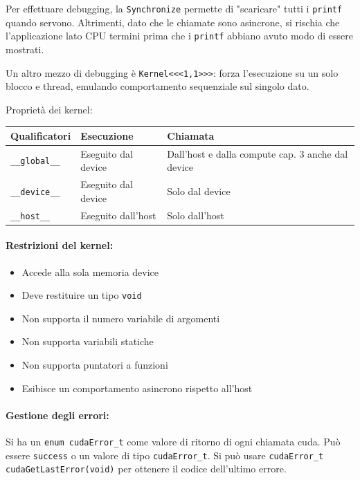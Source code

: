 Per effettuare debugging, la \texttt{Synchronize} permette di "scaricare" tutti i \texttt{printf} quando servono. Altrimenti, dato che le chiamate sono asincrone, si rischia che l'applicazione lato CPU termini prima che i \texttt{printf} abbiano avuto modo di essere mostrati.

Un altro mezzo di debugging è \texttt{Kernel<<<1,1>>>}: forza l'esecuzione su un solo blocco e thread, emulando comportamento sequenziale sul singolo dato.

Proprietà dei kernel: 
\begin{center}
	\begin{tabular}{| l | l | p{4cm} |}
		\hline
		\textbf{Qualificatori} & \textbf{Esecuzione} & \textbf{Chiamata} \\
		\hline
		\texttt{\_\_global\_\_} & Eseguito dal device & Dall’host e dalla compute cap. 3 anche dal device \\
		\hline
		\texttt{\_\_device\_\_} & Eseguito dal device & Solo dal device \\
		\hline
		\texttt{\_\_host\_\_} & Eseguito dall’host & Solo dall’host \\
		\hline
	\end{tabular}
\end{center}

\paragraph{Restrizioni del kernel:}
\begin{itemize}
	\item Accede alla sola memoria device
	
	\item Deve restituire un tipo \texttt{void}
	
	\item Non supporta il numero variabile di argomenti
	
	\item Non supporta variabili statiche
	
	\item Non supporta puntatori a funzioni
	
	\item Esibisce un comportamento asincrono rispetto all'host
\end{itemize}

\paragraph{Gestione degli errori:} Si ha un \texttt{enum cudaError\_t} come valore di ritorno di ogni chiamata cuda. Può essere \texttt{success} o un valore di tipo \texttt{cudaError\_t}. Si può usare \texttt{cudaError\_t cudaGetLastError(void)} per ottenere il codice dell'ultimo errore.

